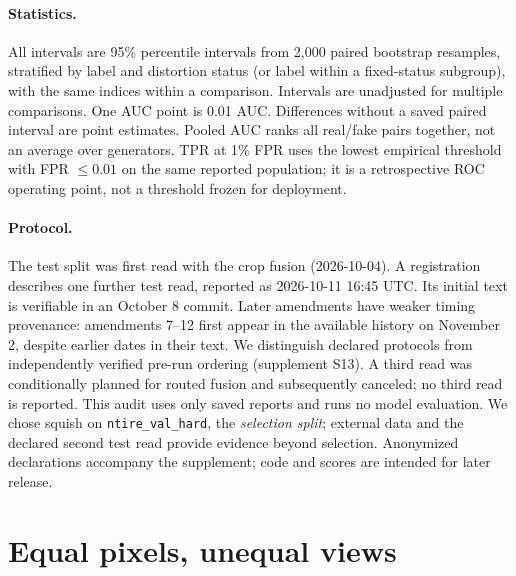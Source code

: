 \documentclass[letterpaper]{article} %
\begin{document}
\paragraph{Statistics.} All intervals are 95\% percentile intervals from 2,000
paired bootstrap resamples, stratified by label and distortion status (or label within a fixed-status subgroup), with the same indices within a comparison. Intervals are unadjusted for multiple comparisons. One AUC point is 0.01 AUC. Differences without a saved paired interval are point estimates. Pooled AUC ranks all real/fake pairs together, not an average over generators. TPR at 1\% FPR uses the lowest empirical threshold with FPR $\leq0.01$ on the same reported population; it is a retrospective ROC operating point, not a threshold frozen for deployment.

\paragraph{Protocol.} The test split was first read with the crop fusion
(2026-10-04). A registration describes one further test read, reported as 2026-10-11 16:45 UTC. Its initial text is verifiable in an October 8 commit. Later amendments have weaker timing provenance: amendments 7--12 first appear in the available history on November 2, despite earlier dates in their text. We distinguish declared protocols from independently verified pre-run ordering (supplement S13). A third read was conditionally planned for routed fusion and subsequently canceled; no third read is reported. This audit uses only saved reports and runs no model evaluation. We chose squish on \texttt{ntire\_val\_hard}, the \emph{selection split}; external data and the declared second test read provide evidence beyond selection. Anonymized declarations accompany the supplement; code and scores are intended for later release.

\section{Equal pixels, unequal views}
\label{sec:diagnosis}
\end{document}
